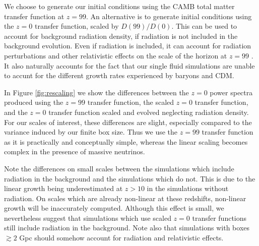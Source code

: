 \documentclass[useAMS, usenatbib]{mnras}
\begin{document}
We choose to generate our initial conditions using the CAMB total matter transfer 
function at $z=99$. An alternative is to generate initial conditions 
using the $z=0$ transfer function, scaled by $D(99)/D(0)$. This can 
be used to account for background radiation density, if radiation is not included
in the background evolution. Even if radiation is included, it can account 
for radiation perturbations and other relativistic effects on the scale 
of the horizon at $z=99$ \citep{Zennaro:2016}. It also naturally accounts 
for the fact that our single fluid simulations are unable to accunt for 
the different growth rates experienced by baryons and CDM.

In Figure \ref{fig:rescaling} we show the differences between the $z=0$ 
power spectra produced using the $z=99$ transfer function, the 
scaled $z=0$ transfer function, and the $z=0$ transfer function 
scaled and evolved neglecting radiation density. 
For our scales of interest, these differences are slight, 
especially compared to the variance induced by our finite box size.
Thus we use the $z=99$ transfer function as it is practically and conceptually simple, 
whereas the linear scaling becomes complex in the presence of massive neutrinos.

Note the differences on small scales between the simulations which 
include radiation in the background and the simulations which do not.
This is due to the linear growth being underestimated 
at $z > 10$ in the simulations without radiation. On scales which are
already non-linear at these redshifts, non-linear growth will be inaccurately
computed. Although this effect is small, we nevertheless suggest that simulations
which use scaled $z=0$ transfer functions still include radiation in the background.
Note also that simulations with boxes $\gtrsim 2$ Gpc should somehow account 
for radiation and relativistic effects. 

\label{lastpage}


\end{document}
